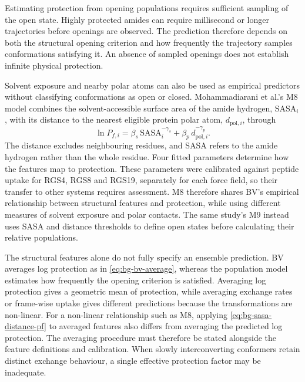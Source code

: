 Estimating protection from opening populations requires sufficient sampling of the open state. Highly protected amides can require millisecond or longer trajectories before openings are observed.\supercite{mohammadiaraniInterpretingHydrogenDeuteriumExchange2018} The prediction therefore depends on both the structural opening criterion and how frequently the trajectory samples conformations satisfying it. An absence of sampled openings does not establish infinite physical protection.

Solvent exposure and nearby polar atoms can also be used as empirical predictors without classifying conformations as open or closed. Mohammadiarani et al.'s M8 model combines the solvent-accessible surface area of the amide hydrogen, $\mathrm{SASA}_i$, with its distance to the nearest eligible protein polar atom, $d_{\mathrm{pol},i}$, through
\begin{equation}
    \ln P_{f,i}
    =\beta_s\,\mathrm{SASA}_i^{-\gamma_s}
    +\beta_p\,d_{\mathrm{pol},i}^{-\gamma_p}.
    \label{eq:bg-sasa-distance-pf}
\end{equation}
The distance excludes neighbouring residues, and SASA refers to the amide hydrogen rather than the whole residue. Four fitted parameters determine how the features map to protection. These parameters were calibrated against peptide uptake for RGS4, RGS8 and RGS19, separately for each force field, so their transfer to other systems requires assessment.\supercite{mohammadiaraniInterpretingHydrogenDeuteriumExchange2018} M8 therefore shares BV's empirical relationship between structural features and protection, while using different measures of solvent exposure and polar contacts. The same study's M9 instead uses SASA and distance thresholds to define open states before calculating their relative populations.\supercite{mohammadiaraniInterpretingHydrogenDeuteriumExchange2018}

The structural features alone do not fully specify an ensemble prediction. BV averages log protection as in \cref{eq:bg-bv-average}, whereas the population model estimates how frequently the opening criterion is satisfied. Averaging log protection gives a geometric mean of protection, while averaging exchange rates or frame-wise uptake gives different predictions because the transformations are non-linear. For a non-linear relationship such as M8, applying \cref{eq:bg-sasa-distance-pf} to averaged features also differs from averaging the predicted log protection. The averaging procedure must therefore be stated alongside the feature definitions and calibration. When slowly interconverting conformers retain distinct exchange behaviour, a single effective protection factor may be inadequate.\supercite{skinnerEstimatingConstraintsProtection2019}


